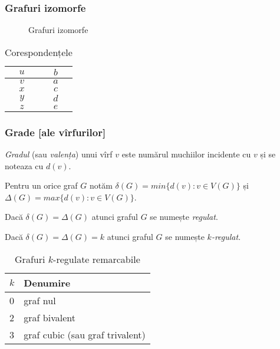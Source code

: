 \begin{frame}
  \frametitle{Grafuri izomorfe}

\begin{figure}
\centering%
\caption{Grafuri izomorfe}
\end{figure}

\begin{table}
\begin{tabular}{|c|c|}
\hline
$u$ & $b$\\
\hline
$v$ & $a$\\
\hline
$x$ & $c$\\
\hline
$y$ & $d$\\
\hline
$z$ & $e$\\
\hline
\end{tabular}
\caption{Corespondențele}
\end{table}

\end{frame}


\begin{frame}
  \frametitle{Grade [ale vîrfurilor]}

\emph{Gradul} (sau \emph{valența}) unui vîrf $v$ este numărul muchiilor incidente cu $v$ și se noteaza cu $d(v)$. 

Pentru un orice graf $G$ notăm $\delta(G)=min\{d(v): v\in V(G)\}$ și $\Delta(G)=max\{d(v): v\in V(G)\}$. 

Dacă $\delta(G)=\Delta(G)$ atunci graful $G$ se numește \emph{regulat}. 

Dacă $\delta(G)=\Delta(G)=k$ atunci graful $G$ se numește \emph{$k$-regulat}.

\begin{table}
\centering%
\begin{tabular}{|l|l|}
\hline
\textbf{$k$}	& \textbf{Denumire}\\
\hline
0		& graf nul\\
\hline
2		& graf bivalent\\
\hline
3		& graf cubic (sau graf trivalent)\\
\hline
\end{tabular}%
\caption{Grafuri $k$-regulate remarcabile}
\end{table}
  
\end{frame}

